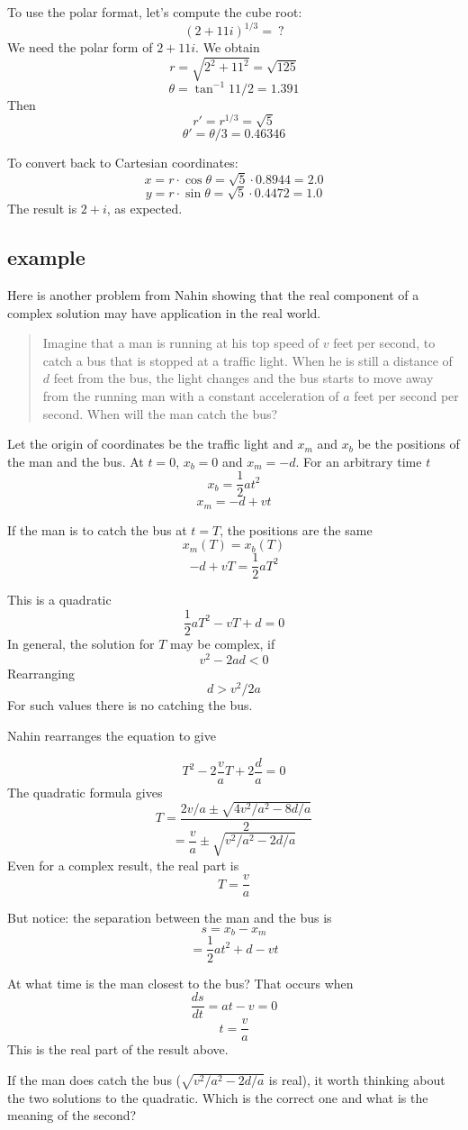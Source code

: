 \documentclass[11pt, oneside]{article}
\begin{document}
To use the polar format, let's compute the cube root:
\[ (2 + 11i)^{1/3} = \ ? \]
We need the polar form of $2 + 11i$.  We obtain
\[ r = \sqrt{2^2 + 11^2} = \sqrt{125} \]
\[ \theta = \tan^{-1} 11/2 =  1.391 \]
Then
\[ r' = r^{1/3} = \sqrt{5} \]
\[ \theta' = \theta/3 = 0.46346 \]

To convert back to Cartesian coordinates:
\[ x = r \cdot \cos \theta = \sqrt{5} \cdot 0.8944 = 2.0 \]
\[ y = r \cdot \sin \theta = \sqrt{5} \cdot 0.4472 = 1.0 \]
The result is $2 + i$, as expected.

\subsection*{example}

Here is another problem from Nahin showing that the real component of a complex solution may have application in the real world.

\begin{quote}Imagine that a man is running at his top speed of $v$ feet per second, to catch a bus that is stopped at a traffic light. When he is still a distance of $d$ feet from the bus, the light changes and the bus starts to move away from the running man with a constant acceleration of $a$ feet per second per second. When will the man catch the bus?
\end{quote}
 
Let the origin of coordinates be the traffic light and $x_m$ and $x_b$ be the positions of the man and the bus.  At $t = 0$, $x_b = 0$ and $x_m = - d$.  For an arbitrary time $t$
\[ x_b = \frac{1}{2} at^2 \]
\[ x_m = -d + vt \]

If the man is to catch the bus at $t = T$, the positions are the same
\[ x_m(T) = x_b(T) \]
\[ -d + vT  = \frac{1}{2} aT^2 \]

This is a quadratic
\[ \frac{1}{2} aT^2 - vT + d = 0 \]
In general, the solution for $T$ may be complex, if 
\[ v^2 - 2ad < 0 \]
Rearranging
\[ d > v^2/2a \]
For such values there is no catching the bus.  

Nahin rearranges the equation to give

\[ T^2 - 2 \frac{v}{a} T + 2\frac{d}{a} = 0 \]
The quadratic formula gives
\[ T = \frac{2v/a \pm \sqrt{4v^2/a^2 - 8d/a}}{2} \]
\[ = \frac{v}{a} \pm \sqrt{v^2/a^2 - 2d/a} \]
Even for a complex result, the real part is
\[ T = \frac{v}{a} \]

But notice:  the separation between the man and the bus is
\[ s = x_b - x_m \]
\[ = \frac{1}{2} at^2 + d - vt \]

At what time is the man closest to the bus?  That occurs when
\[ \frac{ds}{dt} = at - v = 0 \]
\[ t = \frac{v}{a} \]
This is the real part of the result above.

If the man does catch the bus ($ \sqrt{v^2/a^2 - 2d/a}$ is real), it worth thinking about the two solutions to the quadratic.  Which is the correct one and what is the meaning of the second?
\end{document}
